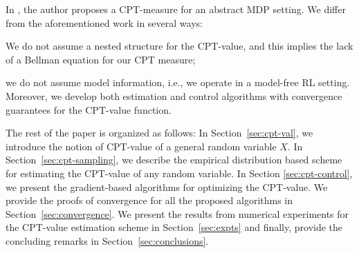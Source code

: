 In \cite{lin2013stochastic}, the author proposes a CPT-measure for an abstract MDP setting.
 We differ from the aforementioned work in several ways:
\begin{inparaenum}[\it (i)]
\item We do not assume a nested structure for the CPT-value, %
and this implies the lack of a Bellman equation for our CPT measure;
\item we do not assume model information, i.e., we operate in a model-free RL setting. Moreover, we develop both estimation and control algorithms with convergence guarantees for the CPT-value function.
\end{inparaenum}
\fi

The rest of the paper is organized as follows: 
In Section~\ref{sec:cpt-val}, we introduce the notion of CPT-value of a general random variable $X$.
In Section~\ref{sec:cpt-sampling}, we
describe the empirical distribution based scheme for estimating the CPT-value of any random variable. In Section \ref{sec:cpt-control}, we present the gradient-based algorithms for optimizing the CPT-value. 
We provide the proofs of convergence for all the proposed algorithms in Section~\ref{sec:convergence}.
We present the results from numerical experiments for the CPT-value estimation scheme in Section~\ref{sec:expts} and finally, provide the concluding remarks in Section~\ref{sec:conclusions}.
